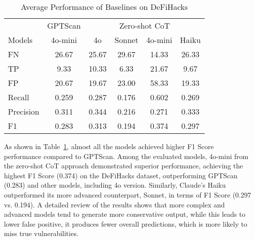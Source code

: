 



\begin{table}
\caption{Average Performance of Baselines on DeFiHacks}
\label{table:baselines}
\begin{tabular}{@{}l|c|cccc@{}}
\toprule
          & GPTScan & \multicolumn{4}{c}{Zero-shot CoT}                                      \\
Models    & 4o-mini & 4o    & Sonnet & 4o-mini                                         & Haiku \\ \midrule
FN        & 26.67   & 25.67 & 29.67  & 14.33                                           & 26.33 \\
TP        & 9.33    & 10.33 & 6.33   & 21.67                                           & 9.67  \\
FP        & 20.67   & 19.67 & 23.00  & 58.33                                           & 19.33 \\ \midrule
Recall    & 0.259   & 0.287 & 0.176  & 0.602                                           & 0.269 \\
Precision & 0.311   & 0.344 & 0.216  & 0.271                                           & 0.333 \\
F1        & 0.283   & 0.313 & 0.194  & \color[HTML]{C834FC} 0.374 & 0.297 \\ \bottomrule
\end{tabular}
\end{table}

As shown in Table~\ref{table:baselines}, almost all the models achieved higher F1 Score performance compared to GPTScan. Among the evaluated models, 4o-mini from the zero-shot CoT approach demonstrated superior performance, achieving the highest F1 Score (0.374) on the DeFiHacks dataset, outperforming GPTScan (0.283) and other models, including 4o version. Similarly, Claude's Haiku outperformed its more advanced counterpart, Sonnet, in terms of F1 Score (0.297 vs. 0.194).
A detailed review of the results shows that more complex and advanced models tend to generate more conservative output, while this leads to lower false positive, it produces fewer overall predictions,  which is more likely to miss true vulnerabilities.

